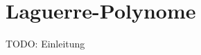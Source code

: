 %
%
%
\chapter{Laguerre-Polynome\label{chapter:laguerre}}
\begin{refsection}

{\large \color{red} TODO: Einleitung}





% 
% 

\printbibliography[heading=subbibliography]
\end{refsection}
